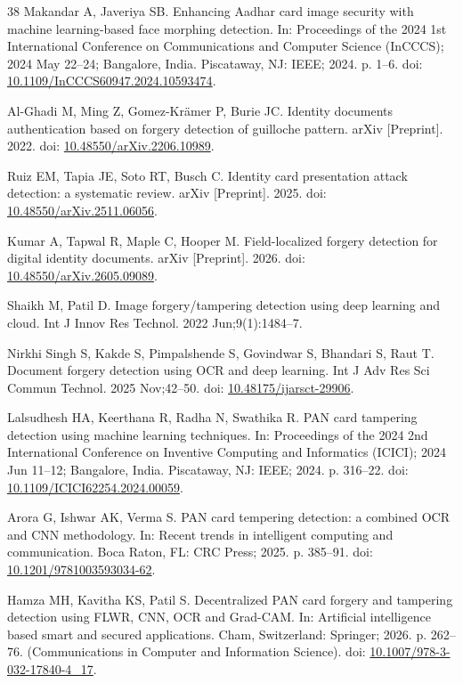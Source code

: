 \documentclass[12pt]{article}
\begin{document}
\begin{thebibliography}{38}
Makandar A, Javeriya SB. Enhancing Aadhar card image security with machine learning-based face morphing detection. In: Proceedings of the 2024 1st International Conference on Communications and Computer Science (InCCCS); 2024 May 22--24; Bangalore, India. Piscataway, NJ: IEEE; 2024. p. 1--6. doi: \href{https://doi.org/10.1109/InCCCS60947.2024.10593474}{10.1109/InCCCS60947.2024.10593474}.

Al-Ghadi M, Ming Z, Gomez-Kr\"amer P, Burie JC. Identity documents authentication based on forgery detection of guilloche pattern. arXiv [Preprint]. 2022. doi: \href{https://doi.org/10.48550/arXiv.2206.10989}{10.48550/arXiv.2206.10989}.

Ruiz EM, Tapia JE, Soto RT, Busch C. Identity card presentation attack detection: a systematic review. arXiv [Preprint]. 2025. doi: \href{https://doi.org/10.48550/arXiv.2511.06056}{10.48550/arXiv.2511.06056}.

Kumar A, Tapwal R, Maple C, Hooper M. Field-localized forgery detection for digital identity documents. arXiv [Preprint]. 2026. doi: \href{https://doi.org/10.48550/arXiv.2605.09089}{10.48550/arXiv.2605.09089}.

Shaikh M, Patil D. Image forgery/tampering detection using deep learning and cloud. Int J Innov Res Technol. 2022 Jun;9(1):1484--7.

Nirkhi Singh S, Kakde S, Pimpalshende S, Govindwar S, Bhandari S, Raut T. Document forgery detection using OCR and deep learning. Int J Adv Res Sci Commun Technol. 2025 Nov;42--50. doi: \href{https://doi.org/10.48175/ijarsct-29906}{10.48175/ijarsct-29906}.

Lalsudhesh HA, Keerthana R, Radha N, Swathika R. PAN card tampering detection using machine learning techniques. In: Proceedings of the 2024 2nd International Conference on Inventive Computing and Informatics (ICICI); 2024 Jun 11--12; Bangalore, India. Piscataway, NJ: IEEE; 2024. p. 316--22. doi: \href{https://doi.org/10.1109/ICICI62254.2024.00059}{10.1109/ICICI62254.2024.00059}.

Arora G, Ishwar AK, Verma S. PAN card tempering detection: a combined OCR and CNN methodology. In: Recent trends in intelligent computing and communication. Boca Raton, FL: CRC Press; 2025. p. 385--91. doi: \href{https://doi.org/10.1201/9781003593034-62}{10.1201/9781003593034-62}.

Hamza MH, Kavitha KS, Patil S. Decentralized PAN card forgery and tampering detection using FLWR, CNN, OCR and Grad-CAM. In: Artificial intelligence based smart and secured applications. Cham, Switzerland: Springer; 2026. p. 262--76. (Communications in Computer and Information Science). doi: \href{https://doi.org/10.1007/978-3-032-17840-4_17}{10.1007/978-3-032-17840-4\_17}.


\end{thebibliography}
\end{document}
